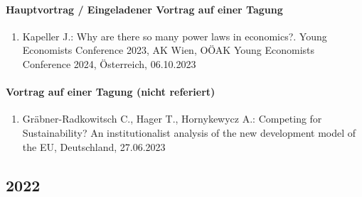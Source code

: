 \paragraph{Hauptvortrag / Eingeladener Vortrag auf einer Tagung}
\begin{enumerate}
	\item Kapeller J.: Why are there so many power laws in economics?. Young Economists Conference 2023, AK Wien, OÖAK Young Economists Conference 2024, Österreich, 06.10.2023
\end{enumerate}
\paragraph{Vortrag auf einer Tagung (nicht referiert)}
\begin{enumerate}
	\item Gräbner-Radkowitsch C., Hager T., Hornykewycz A.: Competing for Sustainability? An institutionalist analysis of the new development model of the EU, Deutschland, 27.06.2023
\end{enumerate}
\subsection*{2022}
